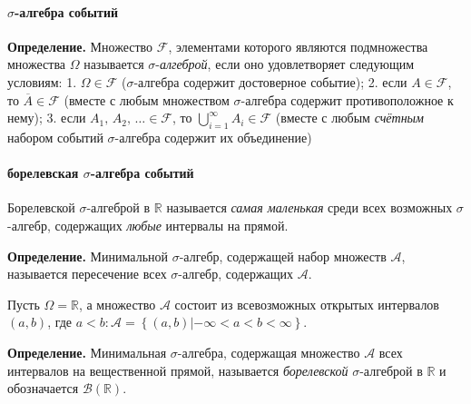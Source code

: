 \documentclass[11pt,a4paper]{article}
\begin{document}
\hypertarget{sigma-ux430ux43bux433ux435ux431ux440ux430-ux441ux43eux431ux44bux442ux438ux439}{%
\paragraph{\texorpdfstring{\(\sigma\)-алгебра
событий}{\textbackslash{}sigma-алгебра событий}}\label{sigma-ux430ux43bux433ux435ux431ux440ux430-ux441ux43eux431ux44bux442ux438ux439}}

\textbf{Определение.} Множество \(\mathcal{F}\), элементами которого
являются подмножества множества \(\Omega\) называется
\(\sigma\)-\emph{алгеброй}, если оно удовлетворяет следующим условиям:
1. \(\Omega \in \mathcal{F}\) (\(\sigma\)-алгебра содержит достоверное
событие); 2. если \(A \in \mathcal{F}\), то
\(\overline{A} \in \mathcal{F}\) (вместе с любым множеством
\(\sigma\)-алгебра содержит противоположное к нему); 3. если
\(A_1,\,A_2,\,\ldots \in \mathcal{F}\), то
\(\bigcup\limits_{i=1}^{\infty}A_i \in \mathcal{F}\) (вместе с любым
\emph{счётным} набором событий \(\sigma\)-алгебра содержит их
объединение)

\hypertarget{ux431ux43eux440ux435ux43bux435ux432ux441ux43aux430ux44f-sigma-ux430ux43bux433ux435ux431ux440ux430-ux441ux43eux431ux44bux442ux438ux439}{%
\paragraph{\texorpdfstring{борелевская \(\sigma\)-алгебра
событий}{борелевская \textbackslash{}sigma-алгебра событий}}\label{ux431ux43eux440ux435ux43bux435ux432ux441ux43aux430ux44f-sigma-ux430ux43bux433ux435ux431ux440ux430-ux441ux43eux431ux44bux442ux438ux439}}

Борелевской \(\sigma\)-алгеброй в \(\mathbb{R}\) называется \emph{самая
маленькая} среди всех возможных \(\sigma\)-алгебр, содержащих
\emph{любые} интервалы на прямой.

\textbf{Определение.} Минимальной \(\sigma\)-алгебр, содержащей набор
множеств \(\mathcal{A}\), называется пересечение всех \(\sigma\)-алгебр,
содержащих \(\mathcal{A}\).

Пусть \(\Omega = \mathbb{R}\), а множество \(\mathcal{A}\) состоит из
всевозможных открытых интервалов \((a, b)\), где
\(a < b : \mathcal{A} = \left\{ (a, b) | -\infty < a < b < \infty \right\}\).

\textbf{Определение.} Минимальная \(\sigma\)-алгебра, содержащая
множество \(\mathcal{A}\) всех интервалов на вещественной прямой,
называется \emph{борелевской} \(\sigma\)-алгеброй в \(\mathbb{R}\) и
обозначается \(\mathcal{B}(\mathbb{R})\).
\end{document}

